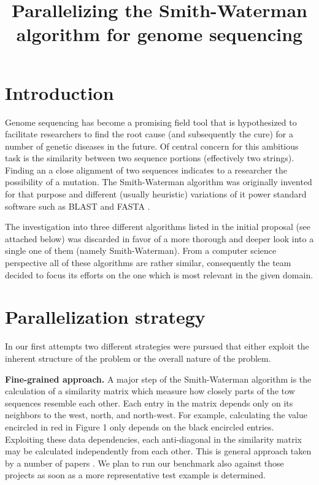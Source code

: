 \documentclass[letterpaper]{article}
\title{Parallelizing the Smith-Waterman algorithm for genome sequencing}
\newcommand{\mypar}[1]{{\bf #1.}}
\begin{document}
%
\maketitle
%

\section{Introduction}

Genome sequencing has become a promising field tool that is hypothesized to facilitate researchers to find the root cause (and subsequently the cure) for a number of genetic diseases in the future. Of central concern for this ambitious task is the similarity between two sequence portions (effectively two strings). Finding an a close alignment of two sequences indicates to a researcher the possibility of a mutation. The Smith-Waterman algorithm was originally invented for that purpose and different (usually heuristic) variations of it power standard software such as BLAST and FASTA \cite{Maekinen.2015}.

The investigation into three different algorithms listed in the initial proposal (see attached below) was discarded in favor of a more thorough and deeper look into a single one of them (namely Smith-Waterman). From a computer science perspective all of these algorithms are rather similar, consequently the team decided to focus its efforts on the one which is most relevant in the given domain.

\section{Parallelization strategy}
In our first attempts two different strategies were pursued that either exploit the inherent structure of the problem or the overall nature of the problem.

\mypar{Fine-grained approach} A major step of the Smith-Waterman algorithm is the calculation of a similarity matrix which measure how closely parts of the tow sequences resemble each other. Each entry in the matrix depends only on its neighbors to the west, north, and north-west. For example, calculating the value encircled in red in Figure 1 only depends on the black encircled entries. Exploiting these data dependencies, each anti-diagonal in the similarity matrix may be calculated independently from each other. This is general approach taken by a number of papers \cite[Sec. 2]{Chen.2010}. We plan to run our benchmark also against those projects as soon as a more representative test example is determined.
\end{document}
